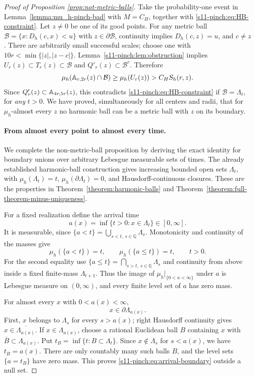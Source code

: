 \documentclass[12pt]{amsart}
\numberwithin{equation}{section}
\begin{document}
\begin{proof}[Proof of Proposition \ref{prop:not-metric-balls}]
Take the probability-one event in Lemma~\ref{lemma:mu_h-pinch-bad}
with $M=C_H$, together with \eqref{s11-pinch:eq:HB-constraint}.
Let $z\ne0$ be one of its good points. For any metric ball
$\mathcal B=\{x:D_h(c,x)<u\}$ with
$z\in\partial\mathcal B$, continuity implies $D_h(c,z)=u$,
and $c\ne z$. There are arbitrarily small successful scales;
choose one with
$10r<\min\{|z|,|z-c|\}$.
Lemma~\ref{s11-pinch:lem:obstruction} implies
$U_r(z)\subset T_r(z)\subset\mathcal B$ and
$Q'_r(z)\subset\mathcal B^c$. Therefore
\[
 \mu_h(\mathbb{A}_{r,2r}(z)\cap\mathcal B)
 \ge\mu_h(U_r(z))>C_H S_h(r,z).
\]
Since $Q'_r(z)\subset\mathbb{A}_{4r,5r}(z)$, this contradicts
\eqref{s11-pinch:eq:HB-constraint} if $\mathcal B=\Lambda_t$, for
\emph{any} $t>0$. We have proved, simultaneously for all
centers and radii, that for $\mu_h$-almost every $z$ no
harmonic ball can be a metric ball with $z$ on its boundary.

\paragraph{From almost every point to almost every time.}
We complete the non-metric-ball proposition by deriving
the exact identity for boundary unions over
arbitrary Lebesgue measurable sets of times.
The already established harmonic-ball construction
gives increasing bounded open sets $\Lambda_t$, with
$\mu_h(\Lambda_t)=t$, $\mu_h(\partial\Lambda_t)=0$, and
Hausdorff-continuous closures. These are the properties in
Theorem~\ref{theorem:harmonic-balls} and Theorem~\ref{theorem:full-theorem-minus-uniqueness}.

For a fixed realization define the arrival time
\[
 a(x)=\inf\{t>0:x\in\Lambda_t\}\in[0,\infty].
\]
It is measurable, since $\{a<t\}=\bigcup_{s<t,\ s\in\mathbb Q}\Lambda_s$.
Monotonicity and continuity of the masses give
\[
 \mu_h(\{a<t\})=t,\qquad
 \mu_h(\{a\le t\})=t,\qquad t>0.
\]
For the second equality use
$\{a\le t\}=\bigcap_{s>t,\ s\in\mathbb Q}\Lambda_s$ and
continuity from above inside a fixed finite-mass $\Lambda_{t+1}$.
Thus the image of $\mu_h|_{\{0<a<\infty\}}$ under $a$ is
Lebesgue measure on $(0,\infty)$, and every finite level set
of $a$ has zero mass.

For almost every $x$ with $0<a(x)<\infty$,
\begin{equation}\label{s11-pinch:eq:arrival-boundary}
                     x\in\partial\Lambda_{a(x)}.
\end{equation}
First, $x$ belongs to $\Lambda_s$ for every $s>a(x)$;
right Hausdorff continuity gives
$x\in\overline{\Lambda_{a(x)}}$.
If $x\in\Lambda_{a(x)}$, choose a rational Euclidean ball
$B$ containing $x$ with $\overline B\subset\Lambda_{a(x)}$.
Put $t_B=\inf\{t:B\subset\Lambda_t\}$. Since $x\notin\Lambda_s$
for $s<a(x)$, we have $t_B=a(x)$.
There are only countably many such balls $B$, and the level
sets $\{a=t_B\}$ have zero mass. This proves
\eqref{s11-pinch:eq:arrival-boundary} outside a null set.


\end{proof}
\end{document}
